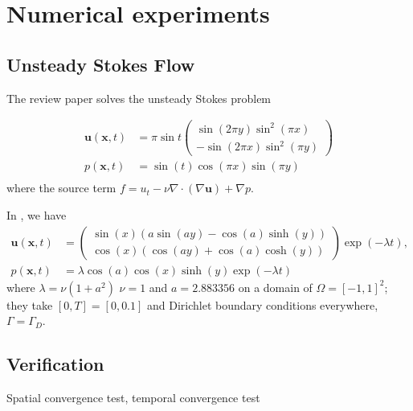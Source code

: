 \section{Numerical experiments}
\label{sec:numerical_experiments}

\subsection{Unsteady Stokes Flow}

The review paper \cite{guermond_overview_2006} solves the unsteady Stokes problem

\begin{equation}
  \begin{aligned}
    \bm{u}(\bm{x}, t) &= \pi \sin t 
    \begin{pmatrix}
      \sin( 2\pi y) \sin^2( \pi x) \\
      -\sin(2 \pi x) \sin^2(\pi y)
    \end{pmatrix} \\
    p(\bm{x}, t) &= \sin(t)\cos(\pi x) \sin(\pi y)\\
  \end{aligned}
  \label{eq:MS_stokes_guermond}
\end{equation}
where the source term $f= u_t -\nu \nabla \cdot( \nabla \bm{u} ) + \nabla p $.

In \cite{fehn_stability_2017}, we have
\begin{equation}
  \begin{aligned}
  \bm{u}(\bm{x}, t) &= 
  \begin{pmatrix}
    \sin(x) (a\sin(a y) - \cos(a)\sinh(y)) \\
    \cos(x) (\cos(a y) + \cos(a)\cosh(y))
  \end{pmatrix}
  \exp(-\lambda t),\\
    p(\bm{x}, t) &= \lambda \cos(a) \cos(x) \sinh(y) \exp(-\lambda t)
  \end{aligned}
  \label{eq:MS_unsteady_stokes_fehn}
\end{equation}
where $\lambda = \nu(1 + a^2)$ $\nu = 1$ and $a = 2.883356$ on a domain of  $\Omega = [-1, 1]^2$; they take $[0, T] = [0, 0.1]$ and Dirichlet boundary conditions everywhere, $\Gamma = \Gamma_D$.

\subsection{Verification}
Spatial convergence test, temporal convergence test




